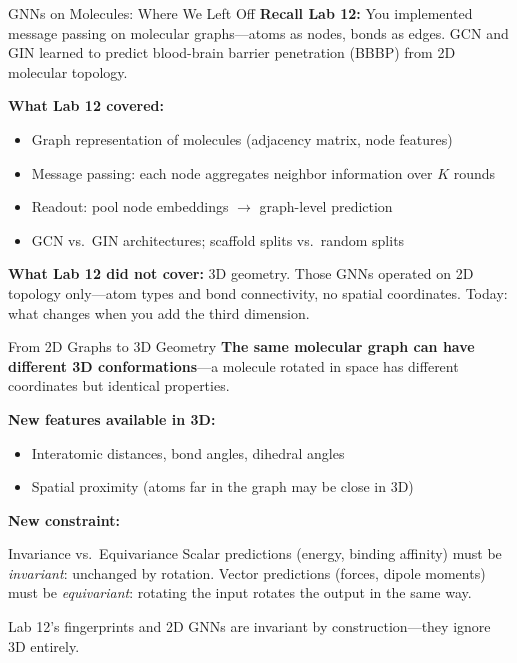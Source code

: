 \documentclass[aspectratio=169,10pt]{beamer}
\begin{document}
\begin{frame}{GNNs on Molecules: Where We Left Off}
\textbf{Recall Lab 12:} You implemented message passing on molecular graphs---atoms as nodes, bonds as edges. GCN and GIN learned to predict blood-brain barrier penetration (BBBP) from 2D molecular topology.

\vspace{0.3em}
\textbf{What Lab 12 covered:}
\begin{itemize}
    \item Graph representation of molecules (adjacency matrix, node features)
    \item Message passing: each node aggregates neighbor information over $K$ rounds
    \item Readout: pool node embeddings $\to$ graph-level prediction
    \item GCN vs.\ GIN architectures; scaffold splits vs.\ random splits
\end{itemize}

\vspace{0.3em}
\textbf{What Lab 12 did not cover:} 3D geometry. Those GNNs operated on 2D topology only---atom types and bond connectivity, no spatial coordinates. Today: what changes when you add the third dimension.
\end{frame}

\begin{frame}{From 2D Graphs to 3D Geometry}
\textbf{The same molecular graph can have different 3D conformations}---a molecule rotated in space has different coordinates but identical properties.

\vspace{0.3em}
\textbf{New features available in 3D:}
\begin{itemize}
    \item Interatomic distances, bond angles, dihedral angles
    \item Spatial proximity (atoms far in the graph may be close in 3D)
\end{itemize}

\vspace{0.2em}
\textbf{New constraint:}
\begin{block}{Invariance vs.\ Equivariance}
Scalar predictions (energy, binding affinity) must be \emph{invariant}: unchanged by rotation. Vector predictions (forces, dipole moments) must be \emph{equivariant}: rotating the input rotates the output in the same way.
\end{block}

{\small Lab 12's fingerprints and 2D GNNs are invariant by construction---they ignore 3D entirely.}
\end{frame}
\end{document}
